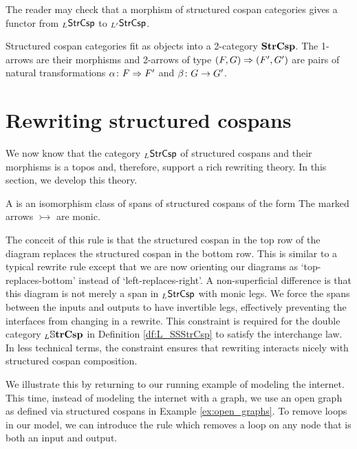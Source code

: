 \documentclass{amsart}
\begin{document}
The reader may check that a morphism of structured cospan
categories gives a functor from $_L\mathsf{StrCsp} $ to
$ _{L'}\mathsf{StrCsp} $. 

Structured cospan categories fit as objects into a
2-category $ \mathbf{StrCsp} $. The 1-arrows are their morphisms
and 2-arrows of type $ (F,G) \Rightarrow (F',G') $ are pairs of
natural transformations $ \alpha \colon F \Rightarrow F' $ and
$ \beta \colon G \to G'$.


\section{Rewriting structured cospans}
\label{sec:RewritingStrCsp}

We now know that the category $ _L\mathsf{StrCsp} $ of
structured cospans and their morphisms is a topos
and, therefore, support a rich rewriting
theory. In this section, we develop this theory.

\begin{definition}
  A  is an
  isomorphism class of spans of structured cospans of the
  form  The marked arrows $ \rightarrowtail $ are
  monic.
\end{definition}

The conceit of this rule is that the structured
cospan in the top row of the diagram replaces the
structured cospan in the bottom row. This is
similar to a typical rewrite rule except that we
are now orienting our diagrams as
`top-replaces-bottom' instead of
`left-replaces-right'.  A non-superficial
difference is that this diagram is not merely a
span in $ _L\mathsf{StrCsp} $ with monic legs.  We force
the spans between the inputs and outputs to have
invertible legs, effectively preventing the
interfaces from changing in a rewrite.  This
constraint is required for the double category
$ _L\mathbb{S} \mathbf{trCsp} $ in Definition \ref{df:L_SSStrCsp}
to satisfy the interchange law. In less technical
terms, the constraint ensures that rewriting interacts nicely
with structured cospan composition.

\begin{example}
  We illustrate this by returning to our running
  example of modeling the internet. This time,
  instead of modeling the internet with a graph,
  we use an open graph as defined via structured
  cospans in Example \ref{ex:open_graphs}. To
  remove loops in our model, we can introduce the
  rule  which
  removes a loop on any node that is both an input
  and output.
\end{example}
\end{document}
